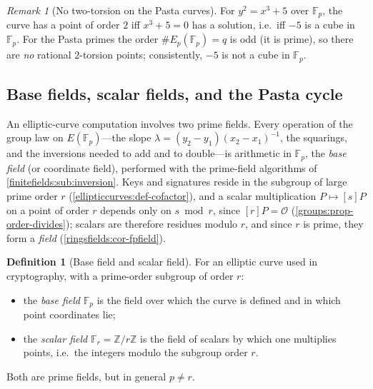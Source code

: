 \documentclass[11pt,a4paper]{article}
\theoremstyle{definition}
\newtheorem{definition}[theorem]{Definition}
\theoremstyle{remark}
\newtheorem{remark}[theorem]{Remark}
\newcommand{\Z}{\ensuremath{\mathbb{Z}}}
\newcommand{\Fp}{\ensuremath{\mathbb{F}_{p}}}
\newcommand{\Fr}{\ensuremath{\mathbb{F}_{r}}}
\begin{document}
\begin{remark}[No two-torsion on the Pasta curves]
\label{ellipticcurves:rem-pasta-odd}
For \(y^2 = x^3 + 5\) over \(\Fp\), the curve has a point of order
\(2\) iff \(x^3 + 5 = 0\) has a solution, i.e.\ iff \(-5\) is a cube in
\(\Fp\). For the Pasta primes the order \(\#E_p(\Fp) = q\) is odd (it
is prime), so there are \emph{no} rational \(2\)-torsion points;
consistently, \(-5\) is not a cube in \(\Fp\).
\end{remark}

\subsection{Base fields, scalar fields, and the Pasta cycle}
\label{ellipticcurves:subsec-basescalar}

An elliptic-curve computation involves two prime fields. Every operation
of the group law on \(E(\Fp)\)---the slope
\(\lambda = (y_2 - y_1)(x_2 - x_1)^{-1}\), the squarings, and the
inversions needed to add and to double---is arithmetic in \(\Fp\), the
\emph{base field} (or coordinate field), performed with the prime-field
algorithms of \cref{finitefields:sub:inversion}. Keys and signatures
reside in the subgroup of large prime order \(r\)
(\cref{ellipticcurves:def-cofactor}), and a scalar multiplication
\(P \mapsto [s]P\) on a point of order \(r\) depends only on
\(s \bmod r\), since \([r]P = \mathcal{O}\)
(\cref{groups:prop-order-divides}); scalars are therefore residues modulo
\(r\), and since \(r\) is prime, they form a \emph{field}
(\cref{ringsfields:cor-fpfield}).

\begin{definition}[Base field and scalar field]
\label{ellipticcurves:def-basescalar}
For an elliptic curve used in cryptography, with a prime-order subgroup
of order \(r\):
\begin{itemize}
  \item the \emph{base field} \(\Fp\) is the field over which the curve
    is defined and in which point coordinates lie;
  \item the \emph{scalar field} \(\Fr = \Z/r\Z\) is the field of
    scalars by which one multiplies points, i.e.\ the integers modulo
    the subgroup order \(r\).
\end{itemize}
Both are prime fields, but in general \(p \neq r\).
\end{definition}
\end{document}

